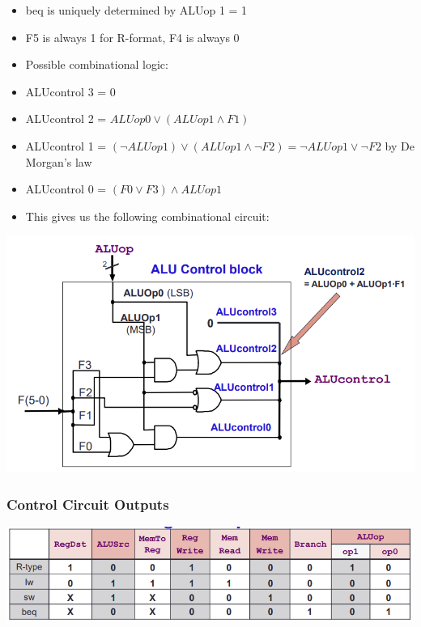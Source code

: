 \documentclass[10pt, portrait]{article}
\begin{document}
\begin{multicols*}{2}
\begin{itemize}
    \item beq is uniquely determined by ALUop 1 = 1
    \item F5 is always 1 for R-format, F4 is always 0
    \item Possible combinational logic:
    \item ALUcontrol 3 = 0
    \item ALUcontrol 2 = $ALUop 0 \lor (ALUop 1 \land F1)$
    \item ALUcontrol 1 = $(\neg ALUop 1) \lor (ALUop 1 \land \neg F2) = \neg ALUop 1 \lor \neg F2$ by De Morgan's law
    \item ALUcontrol 0 = $(F0 \lor F3) \land ALUop 1$
    \item This gives us the following combinational circuit:
\end{itemize}
\begin{center}
    \includegraphics[width=\linewidth]{aluop circuit.png}
\end{center}

\subsubsection{Control Circuit Outputs}
\begin{center}
    \includegraphics[width=\linewidth]{control outputs.png}
\end{center}


\end{multicols*}
\end{document}
